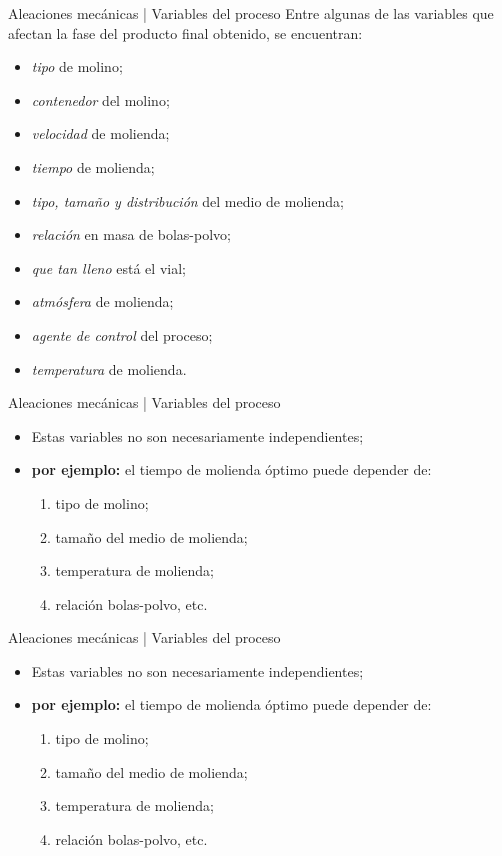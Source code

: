 \documentclass[%
spanish,
    progressbar=head,
background=dark,
subsectionpage
]{beamer}
\begin{document}
\begin{frame}{Aleaciones mecánicas | Variables del proceso}
    Entre algunas de las variables que afectan la fase del producto final obtenido, se encuentran:

    \begin{itemize}
        \item \emph{tipo} de molino;
        \item \emph{contenedor} del molino;
        \item \emph{velocidad} de molienda;
        \item \emph{tiempo} de molienda;
        \item \emph{tipo, tamaño y distribución} del medio de molienda;
        \item \emph{relación} en masa de bolas-polvo;
        \item \emph{que tan lleno} está el vial;
        \item \emph{atmósfera} de molienda;
        \item \emph{agente de control} del proceso;
        \item \emph{temperatura} de molienda.
    \end{itemize}
\end{frame}

\begin{frame}{Aleaciones mecánicas | Variables del proceso}
\begin{itemize}
    \item Estas variables no son necesariamente independientes;\\
    \item[] \textbf{por ejemplo:} el tiempo de molienda óptimo puede depender de: 
    \begin{enumerate}
        \item tipo de molino;
        \item tamaño del medio de molienda;
        \item temperatura de molienda;
        \item relación bolas-polvo, etc.
    \end{enumerate}
\end{itemize}
\end{frame}

\begin{frame}{Aleaciones mecánicas | Variables del proceso}
    \begin{itemize}
        \item Estas variables no son necesariamente independientes;\\
        \item[] \textbf{por ejemplo:} el tiempo de molienda óptimo puede depender de: 
        \begin{enumerate}
            \item tipo de molino;
            \item tamaño del medio de molienda;
            \item temperatura de molienda;
            \item relación bolas-polvo, etc.
        \end{enumerate}
    \end{itemize}
\end{frame}
\end{document}
